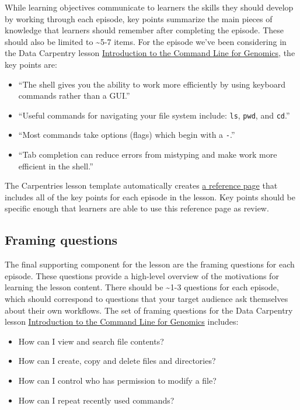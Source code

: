 \documentclass[
]{book}
\providecommand{\tightlist}{%
  \setlength{\itemsep}{0pt}\setlength{\parskip}{0pt}}
\begin{document}
While learning objectives communicate to learners the skills they should develop by working through each episode,
key points summarize the main pieces of knowledge that learners should remember after completing
the episode. These should also be limited to \textasciitilde5-7 items. For the episode we've been considering in the Data Carpentry lesson \href{https://datacarpentry.org/shell-genomics/}{Introduction to the Command Line for Genomics}, the
key points are:

\begin{itemize}
\tightlist
\item
  ``The shell gives you the ability to work more efficiently by using keyboard commands rather than a GUI.''
\item
  ``Useful commands for navigating your file system include: \texttt{ls}, \texttt{pwd}, and \texttt{cd}.''
\item
  ``Most commands take options (flags) which begin with a \texttt{-}.''
\item
  ``Tab completion can reduce errors from mistyping and make work more efficient in the shell.''
\end{itemize}

The Carpentries lesson template automatically creates \href{https://datacarpentry.org/shell-genomics/reference.html}{a reference page} that includes all of the key points for
each episode in the lesson. Key points should be specific enough that learners are able to use this reference
page as review.

\hypertarget{framing-questions}{%
\subsection{Framing questions}\label{framing-questions}}

The final supporting component for the lesson are the framing questions for each episode. These questions
provide a high-level overview of the motivations for learning the lesson content. There should be \textasciitilde1-3
questions for each episode, which should correspond to questions that your target audience ask themselves
about their own workflows. The set of framing questions for the Data Carpentry lesson \href{https://datacarpentry.org/shell-genomics/}{Introduction to the Command Line for Genomics} includes:

\begin{itemize}
\tightlist
\item
  How can I view and search file contents?
\item
  How can I create, copy and delete files and directories?
\item
  How can I control who has permission to modify a file?
\item
  How can I repeat recently used commands?
\end{itemize}
\end{document}
